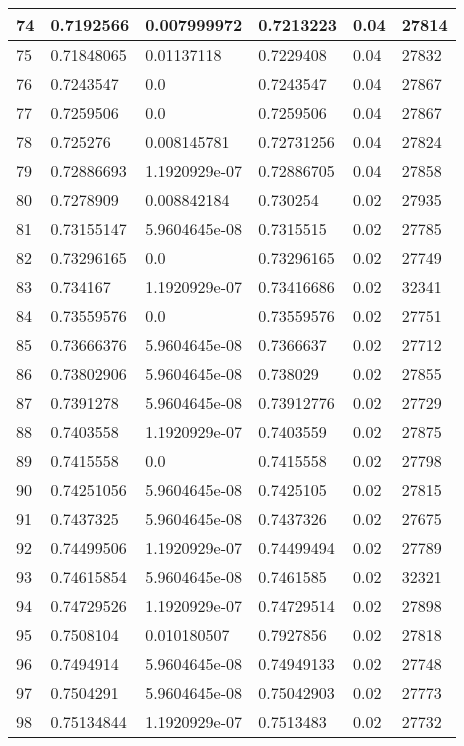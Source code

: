 \begin{longtable}{|l|l|l|l|l|l|}
74 & 0.7192566 & 0.007999972 & 0.7213223 & 0.04 & 27814 \\ \hline 
75 & 0.71848065 & 0.01137118 & 0.7229408 & 0.04 & 27832 \\ \hline 
76 & 0.7243547 & 0.0 & 0.7243547 & 0.04 & 27867 \\ \hline 
77 & 0.7259506 & 0.0 & 0.7259506 & 0.04 & 27867 \\ \hline 
78 & 0.725276 & 0.008145781 & 0.72731256 & 0.04 & 27824 \\ \hline 
79 & 0.72886693 & 1.1920929e-07 & 0.72886705 & 0.04 & 27858 \\ \hline 
80 & 0.7278909 & 0.008842184 & 0.730254 & 0.02 & 27935 \\ \hline 
81 & 0.73155147 & 5.9604645e-08 & 0.7315515 & 0.02 & 27785 \\ \hline 
82 & 0.73296165 & 0.0 & 0.73296165 & 0.02 & 27749 \\ \hline 
83 & 0.734167 & 1.1920929e-07 & 0.73416686 & 0.02 & 32341 \\ \hline 
84 & 0.73559576 & 0.0 & 0.73559576 & 0.02 & 27751 \\ \hline 
85 & 0.73666376 & 5.9604645e-08 & 0.7366637 & 0.02 & 27712 \\ \hline 
86 & 0.73802906 & 5.9604645e-08 & 0.738029 & 0.02 & 27855 \\ \hline 
87 & 0.7391278 & 5.9604645e-08 & 0.73912776 & 0.02 & 27729 \\ \hline 
88 & 0.7403558 & 1.1920929e-07 & 0.7403559 & 0.02 & 27875 \\ \hline 
89 & 0.7415558 & 0.0 & 0.7415558 & 0.02 & 27798 \\ \hline 
90 & 0.74251056 & 5.9604645e-08 & 0.7425105 & 0.02 & 27815 \\ \hline 
91 & 0.7437325 & 5.9604645e-08 & 0.7437326 & 0.02 & 27675 \\ \hline 
92 & 0.74499506 & 1.1920929e-07 & 0.74499494 & 0.02 & 27789 \\ \hline 
93 & 0.74615854 & 5.9604645e-08 & 0.7461585 & 0.02 & 32321 \\ \hline 
94 & 0.74729526 & 1.1920929e-07 & 0.74729514 & 0.02 & 27898 \\ \hline 
95 & 0.7508104 & 0.010180507 & 0.7927856 & 0.02 & 27818 \\ \hline 
96 & 0.7494914 & 5.9604645e-08 & 0.74949133 & 0.02 & 27748 \\ \hline 
97 & 0.7504291 & 5.9604645e-08 & 0.75042903 & 0.02 & 27773 \\ \hline 
98 & 0.75134844 & 1.1920929e-07 & 0.7513483 & 0.02 & 27732 \\ \hline 

\end{longtable}

